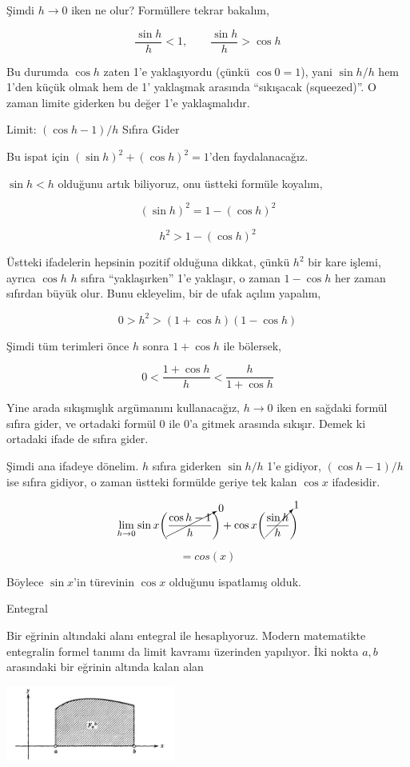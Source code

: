 \documentclass[12pt,fleqn]{article}\usepackage{../../common}
\begin{document}
Şimdi $h \to 0$ iken ne olur? Formüllere tekrar bakalım,

$$ \frac{\sin h}{h} < 1, \qquad  \frac{\sin h}{h} > \cos h $$

Bu durumda $\cos h$ zaten 1'e yaklaşıyordu (çünkü $\cos 0 = 1$), yani $\sin h
/ h$ hem 1'den küçük olmak hem de 1' yaklaşmak arasında ``sıkışacak
(squeezed)''. O zaman limite giderken bu değer 1'e yaklaşmalıdır.

Limit: $(\cos h -1) / h$ Sıfıra Gider

Bu ispat için $(\sin h)^2 + (\cos h)^2 = 1$'den faydalanacağız. 

$\sin h < h$ olduğunu artık biliyoruz, onu üstteki formüle koyalım,

$$ (\sin h)^2 = 1 -  (\cos h)^2$$

$$ h^2 > 1 -  (\cos h)^2$$

Üstteki ifadelerin hepsinin pozitif olduğuna dikkat, çünkü $h^2$ bir kare
işlemi, ayrıca $\cos h$ $h$ sıfıra ``yaklaşırken'' 1'e yaklaşır, o zaman
$1-\cos h$ her zaman sıfırdan büyük olur. Bunu ekleyelim, bir de ufak
açılım yapalım,

$$ 0 > h^2 > (1 + \cos h)(1 - \cos h)$$

Şimdi tüm terimleri önce $h$ sonra $1+\cos h$ ile bölersek, 

$$ 0 < \frac{1 + \cos h}{h} <  \frac{h}{1+\cos h} $$

Yine arada sıkışmışlık argümanını kullanacağız, $h \to 0$ iken en sağdaki
formül sıfıra gider, ve ortadaki formül 0 ile 0'a gitmek arasında
sıkışır. Demek ki ortadaki ifade de sıfıra gider.

Şimdi ana ifadeye dönelim. $h$ sıfıra giderken $\sin h/h$ 1'e gidiyor,
$(\cos h-1)/h$ ise sıfıra gidiyor, o zaman üstteki formülde geriye tek
kalan $\cos x$ ifadesidir. 

$$ \lim_{h \to 0}  
\sin x \bigg( \cancelto{0}{\frac{\cos h - 1}{h}} \bigg) + 
\cos x \bigg( \cancelto{1}{\frac{\sin h}{h}} \bigg)
$$

$$ = cos(x) $$

Böylece $\sin x$'in türevinin $\cos x$ olduğunu ispatlamış olduk.

Entegral

Bir eğrinin altındaki alanı entegral ile hesaplıyoruz. Modern matematikte
entegralin formel tanımı da limit kavramı üzerinden yapılıyor. İki nokta $a,b$
arasındaki bir eğrinin altında kalan alan

\includegraphics[width=15em]{ode_mattuck_65_diffint1_03.jpg}
\end{document}
